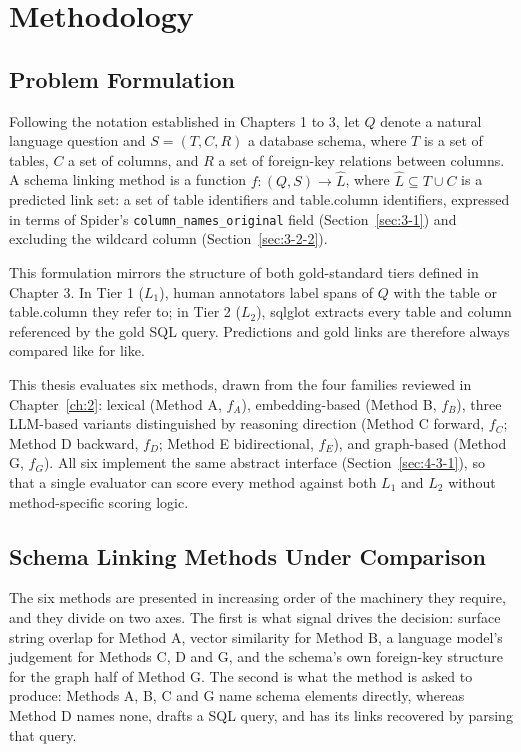 \chapter{Methodology}\label{ch:4}

\section{Problem Formulation}\label{sec:4-1}

Following the notation established in Chapters 1 to 3, let \ensuremath{Q} denote a natural language question and \ensuremath{S = (T, C, R)} a database schema, where \ensuremath{T} is a set of tables, \ensuremath{C} a set of columns, and \ensuremath{R} a set of foreign-key relations between columns. A schema linking method is a function \ensuremath{f\colon (Q, S) \rightarrow \hat{L}}, where \ensuremath{\hat{L} \subseteq T \cup C} is a predicted link set: a set of table identifiers and table.column identifiers, expressed in terms of Spider's \texttt{column\_names\_original} field (Section~\ref{sec:3-1}) and excluding the wildcard column (Section~\ref{sec:3-2-2}).

This formulation mirrors the structure of both gold-standard tiers defined in Chapter 3. In Tier 1 (\ensuremath{L_1}), human annotators label spans of \ensuremath{Q} with the table or table.column they refer to; in Tier 2 (\ensuremath{L_2}), sqlglot extracts every table and column referenced by the gold SQL query. Predictions and gold links are therefore always compared like for like.

This thesis evaluates six methods, drawn from the four families reviewed in Chapter~\ref{ch:2}: lexical (Method A, \ensuremath{f_{A}}), embedding-based (Method B, \ensuremath{f_{B}}), three LLM-based variants distinguished by reasoning direction (Method C forward, \ensuremath{f_{C}}; Method D backward, \ensuremath{f_{D}}; Method E bidirectional, \ensuremath{f_{E}}), and graph-based (Method G, \ensuremath{f_{G}}). All six implement the same abstract interface (Section~\ref{sec:4-3-1}), so that a single evaluator can score every method against both \ensuremath{L_1} and \ensuremath{L_2} without method-specific scoring logic.

\section{Schema Linking Methods Under Comparison}\label{sec:4-2}

The six methods are presented in increasing order of the machinery they require, and they divide on two axes. The first is what signal drives the decision: surface string overlap for Method A, vector similarity for Method B, a language model's judgement for Methods C, D and G, and the schema's own foreign-key structure for the graph half of Method G. The second is what the method is asked to produce: Methods A, B, C and G name schema elements directly, whereas Method D names none, drafts a SQL query, and has its links recovered by parsing that query.

